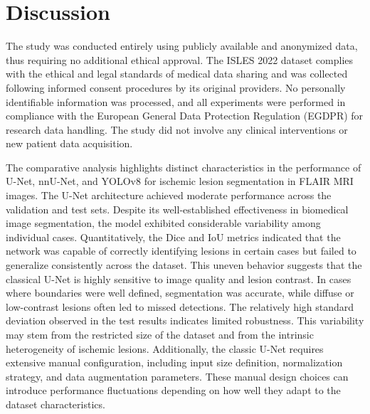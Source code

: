 \documentclass[12pt]{article}
\begin{document}
\section{Discussion} 
\label{sec:discussion}


The study was conducted entirely using publicly available and anonymized data, thus requiring no additional ethical approval. The ISLES 2022 dataset complies with the ethical and legal standards of medical data sharing and was collected following informed consent procedures by its original providers.
%
No personally identifiable information was processed, and all experiments were performed in compliance with the European General Data Protection Regulation (EGDPR) for research data handling. The study did not involve any clinical interventions or new patient data acquisition.

The comparative analysis highlights distinct characteristics in the performance of U-Net, nnU-Net, and YOLOv8 for ischemic lesion segmentation in FLAIR MRI images.
%
The U-Net architecture achieved moderate performance across the validation and test sets. Despite its well-established effectiveness in biomedical image segmentation, the model exhibited considerable variability among individual cases. Quantitatively, the Dice and IoU metrics indicated that the network was capable of correctly identifying lesions in certain cases but failed to generalize consistently across the dataset. This uneven behavior suggests that the classical U-Net is highly sensitive to image quality and lesion contrast. In cases where boundaries were well defined, segmentation was accurate, while diffuse or low-contrast lesions often led to missed detections.
%
The relatively high standard deviation observed in the test results indicates limited robustness. This variability may stem from the restricted size of the dataset and from the intrinsic heterogeneity of ischemic lesions. Additionally, the classic U-Net requires extensive manual configuration, including input size definition, normalization strategy, and data augmentation parameters. These manual design choices can introduce performance fluctuations depending on how well they adapt to the dataset characteristics.
\end{document}

